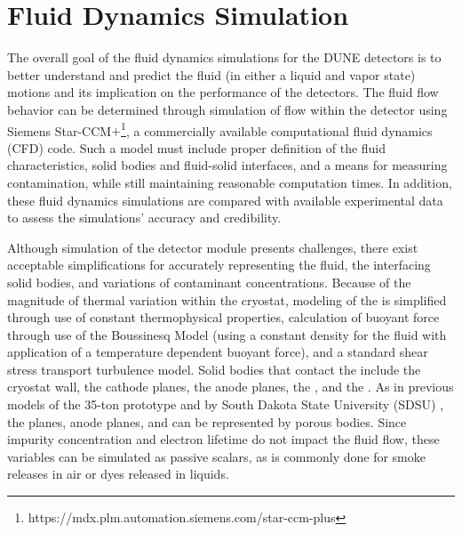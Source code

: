 

\section{Fluid Dynamics Simulation}
The overall goal of the fluid dynamics simulations for the DUNE detectors is to better understand and predict the fluid (in either a liquid and vapor state) motions and its implication on the performance of the detectors. The fluid flow behavior can be determined through simulation of  flow within the detector using Siemens Star-CCM$+$\footnote{https://mdx.plm.automation.siemens.com/star-ccm-plus}, a commercially available computational fluid dynamics (CFD) code. Such a model must include proper definition of the fluid characteristics, solid bodies and fluid-solid interfaces, and a means for measuring contamination, while still maintaining reasonable computation times. In addition, these fluid dynamics simulations are compared with available experimental data to assess the simulations' accuracy and credibility. 

Although simulation of the detector module presents challenges, there exist acceptable simplifications for accurately representing the fluid, the interfacing solid bodies, and variations of contaminant concentrations. Because of the magnitude of thermal variation within the cryostat, modeling of the  is simplified through use of constant thermophysical properties, calculation of buoyant force through use of the Boussinesq Model (using a constant density for the fluid with application of a temperature dependent buoyant force), and a standard shear stress transport turbulence model. Solid bodies that contact the  include the cryostat wall, the cathode planes, the anode planes, the , and the . As in previous  models of the  35-ton prototype and  by South Dakota State University (SDSU) \cite{docdb-5915}, the  planes, anode planes, and  can be represented by porous bodies. Since impurity concentration and electron lifetime do not impact the fluid flow, these variables can be simulated as passive scalars, as is commonly done for smoke releases \cite{cfd-1} 
in air or dyes released in liquids.

